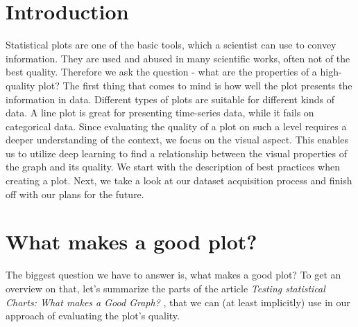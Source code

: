 \documentclass[fleqn,moreauthors,10pt]{ds_report}
\affiliation{\textit{Advisors: Assoc. Prof. dr. Erik Štrumbelj , Assoc. Prof. dr. Tomaž Curk}}
\begin{document}
	
	\flushbottom 
	
	\maketitle 
	
	\thispagestyle{empty} 
	
	
	\section*{Introduction}
	Statistical plots are one of the basic tools, which a scientist can use to convey information. They are used and abused in many scientific works, often not of the best quality. Therefore we ask the question - what are the properties of a high-quality plot? The first thing that comes to mind is how well the plot presents the information in data. Different types of plots are suitable for different kinds of data. A line plot is great for presenting time-series data, while it fails on categorical data. Since evaluating the quality of a plot on such a level requires a deeper understanding of the context, we focus on the visual aspect. This enables us to utilize deep learning to find a relationship between the visual properties of the graph and its quality. We start with the description of best practices when creating a plot. Next, we take a look at our dataset acquisition process and finish off with our plans for the future.
	
	
	
	\section*{What makes a good plot?}
	The biggest question we have to answer is, what makes a good plot? To get an overview on that, let's summarize the parts of the article \emph{Testing statistical Charts: What makes a Good Graph?} \cite{Whatmakesagoodplot}, that we can (at least implicitly) use in our approach of evaluating the plot's quality. 
	
\end{document}
